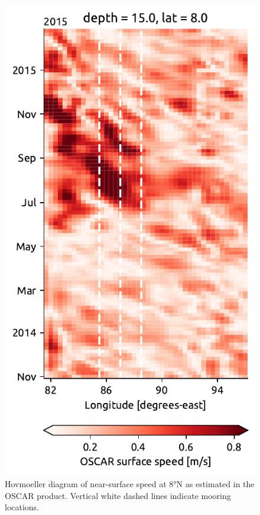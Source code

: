 \documentclass[onecol]{ametsoc}
\begin{document}
\begin{figure}[htbp]
\centering
\includegraphics[height=0.5\textheight]{figure8-oscar.pdf}
\caption{\label{fig:hov}
Hovmoeller diagram of near-surface speed at 8°N as estimated in the OSCAR product. Vertical white dashed lines indicate mooring locations.}
\end{figure}
\end{document}
